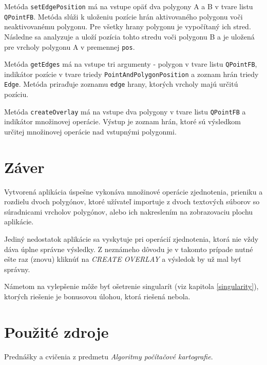 \documentclass[11pt]{article}
\begin{document}
\begin{enumerate}
    Metóda \texttt{setEdgePosition} má na vstupe opäť dva polygony A a B v tvare listu \texttt{QPointFB}. Metóda slúži k uloženiu pozície hrán aktivovaného polygonu voči neaktivovanému polygonu. Pre všetky hrany polygonu je vypočítaný ich stred. Následne sa analyzuje a uloží pozícia tohto stredu voči polygonu B a je uložená pre vrcholy polygonu A v premennej \texttt{pos}.
     
    Metóda \texttt{getEdges} má na vstupe tri argumenty - polygon v tvare listu \texttt{QPointFB}, indikátor pozície v tvare triedy \texttt{PointAndPolygonPosition} a zoznam hrán triedy \texttt{Edge}. Metóda priraďuje zoznamu \texttt{edge} hrany, ktorých vrcholy majú určitú pozíciu. 
    
    Metóda \texttt{createOverlay} má na vstupe dva polygony v tvare listu \texttt{QPointFB} a indikátor množinovej operácie. Výstup je zoznam hrán, ktoré sú výsledkom určitej množinovej operácie nad vstupnými polygonmi. 
    
 
    
\end{enumerate}



\newpage
\section{Záver}
Vytvorená aplikácia úspešne vykonáva množinové operácie zjednotenia, prieniku a rozdielu dvoch polygónov, ktoré užívateľ importuje z dvoch textových súborov so súradnicami vrcholov polygónov, alebo ich nakreslením na zobrazovaciu plochu aplikácie.

Jediný nedostatok aplikácie sa vyskytuje pri operácií zjednotenia, ktorá nie vždy dáva úplne správne výsledky. Z neznámeho dôvodu je v takomto prípade nutné ešte raz (znovu) kliknúť na \textit{CREATE OVERLAY} a výsledok by už mal byť správny.

Námetom na vylepšenie môže byť ošetrenie singularít (viz kapitola \ref{singularity}), ktorých riešenie je bonusovou úlohou, ktorá riešená nebola.

\section{Použité zdroje}
Prednášky a cvičenia z predmetu \textit{Algoritmy počítačové kartografie}.
\end{document}
